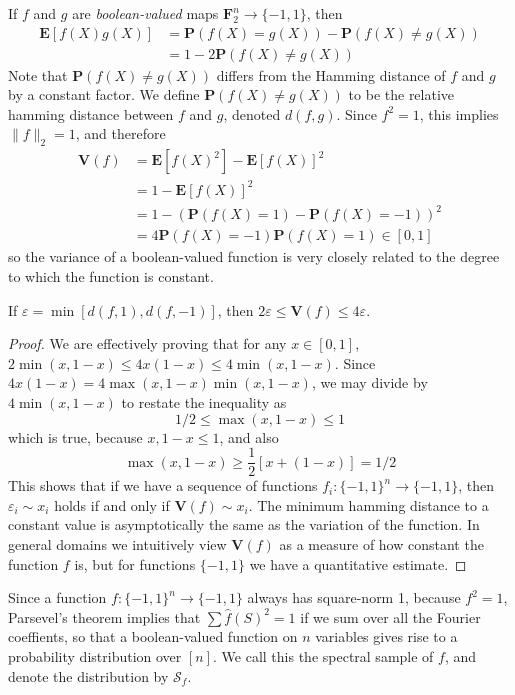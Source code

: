 If $f$ and $g$ are {\it boolean-valued} maps $\mathbf{F}_2^n \to \{ -1 , 1 \}$, then
%
\begin{align*}
    \mathbf{E}[f(X)g(X)] &= \mathbf{P}(f(X) = g(X)) - \mathbf{P}(f(X) \neq g(X))\\
    &= 1 - 2\mathbf{P}(f(X) \neq g(X))
\end{align*}
%
Note that $\mathbf{P}(f(X) \neq g(X))$ differs from the Hamming distance of $f$ and $g$ by a constant factor. We define $\mathbf{P}(f(X) \neq g(X))$ to be the relative hamming distance between $f$ and $g$, denoted $d(f,g)$. Since $f^2 = 1$, this implies $\| f \|_2 = 1$, and therefore
%
\begin{align*}
    \mathbf{V}(f) &= \mathbf{E}[f(X)^2] - \mathbf{E}[f(X)]^2\\
    &= 1 - \mathbf{E}[f(X)]^2\\
    &= 1 - (\mathbf{P}(f(X) = 1) - \mathbf{P}(f(X) = - 1))^2\\
    &= 4 \mathbf{P}(f(X) = -1) \mathbf{P}(f(X) = 1) \in [0,1]
\end{align*}
%
so the variance of a boolean-valued function is very closely related to the degree to which the function is constant.

\begin{theorem}
    If $\varepsilon = \min[d(f,1), d(f,-1)]$, then $2 \varepsilon \leq \mathbf{V}(f) \leq 4 \varepsilon$.
\end{theorem}
\begin{proof}
    We are effectively proving that for any $x \in [0,1]$, $2\min(x,1-x) \leq 4x(1-x) \leq 4\min(x,1-x)$. Since $4x(1-x) = 4\max(x,1-x)\min(x,1-x)$, we may divide by $4 \min(x,1-x)$ to restate the inequality as
    \[ 1/2 \leq \max(x,1-x) \leq 1 \]
    which is true, because $x,1-x \leq 1$, and also
    \[ \max(x,1-x) \geq \frac{1}{2}[x + (1-x)] = 1/2 \]
    This shows that if we have a sequence of functions $f_i: \{ -1, 1 \}^n \to \{ -1, 1 \}$, then $\varepsilon_i \sim x_i$ holds if and only if $\mathbf{V}(f) \sim x_i$. The minimum hamming distance to a constant value is asymptotically the same as the variation of the function. In general domains we intuitively view $\mathbf{V}(f)$ as a measure of how constant the function $f$ is, but for functions $\{ -1, 1 \}$ we have a quantitative estimate.
\end{proof}

Since a function $f: \{ -1, 1 \}^n \to \{ -1, 1 \}$ always has square-norm 1, because $f^2 = 1$, Parsevel's theorem implies that $\sum \widehat{f}(S)^2 = 1$ if we sum over all the Fourier coeffients, so that a boolean-valued function on $n$ variables gives rise to a probability distribution over $[n]$. We call this the spectral sample of $f$, and denote the distribution by $\mathcal{S}_f$.

